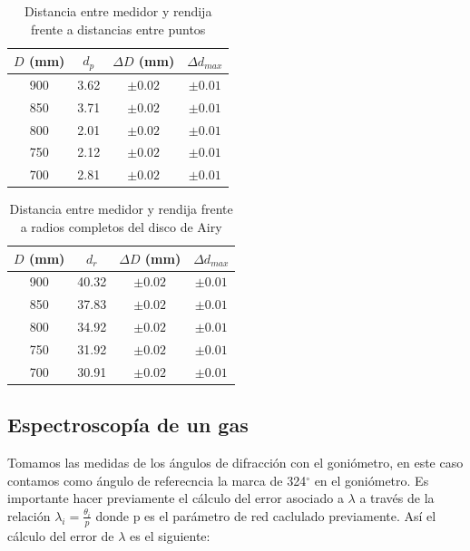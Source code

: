 \documentclass[11pt, a4paper, twocolumn]{article}
\begin{document}
\begin{table}[H]
\caption{Tabla para la toma de mínimos }
\centering
\small
\setlength{\tabcolsep}{4pt}
\begin{tabular}{cccc}
\hline
   $D$ (mm) &   $d_{p}$ & $\Delta D$ (mm)   & $\Delta d_{max}$   \\
\hline
        900 &      3.62 & $\pm 0.02$        & $\pm 0.01$         \\
        850 &      3.71 & $\pm 0.02$        & $\pm 0.01$         \\
        800 &      2.01 & $\pm 0.02$        & $\pm 0.01$         \\
        750 &      2.12 & $\pm 0.02$        & $\pm 0.01$         \\
        700 &      2.81 & $\pm 0.02$        & $\pm 0.01$         \\
\hline
\end{tabular}
\caption{Distancia entre medidor y rendija frente a distancias entre puntos}
\end{table}

\vspace{0.5cm}

\begin{table}[H]
\caption{Tabla para la toma de radios }
\centering
\small
\setlength{\tabcolsep}{4pt}
\begin{tabular}{cccc}
\hline
   $D$ (mm) &   $d_{r}$ & $\Delta D$ (mm)   & $\Delta d_{max}$   \\
\hline
        900 &     40.32 & $\pm 0.02$        & $\pm 0.01$         \\
        850 &     37.83 & $\pm 0.02$        & $\pm 0.01$         \\
        800 &     34.92 & $\pm 0.02$        & $\pm 0.01$         \\
        750 &     31.92 & $\pm 0.02$        & $\pm 0.01$         \\
        700 &     30.91 & $\pm 0.02$        & $\pm 0.01$         \\
\hline
\end{tabular}
\caption{Distancia entre medidor y rendija frente a radios completos del disco de Airy}
\end{table}

\subsection{Espectroscopía de un gas}

Tomamos las medidas de los ángulos de difracción con el goniómetro, en este caso contamos como ángulo de referecncia la marca de 324$^\circ$ en el goniómetro. 
Es importante hacer previamente el cálculo del error asociado a $\lambda$ a través de la relación $\lambda_{i} = \frac{\theta_{i}}{p}$ donde p es el parámetro de red caclulado previamente. 
Así el cálculo del error de $\lambda$ es el siguiente:
\end{document}
